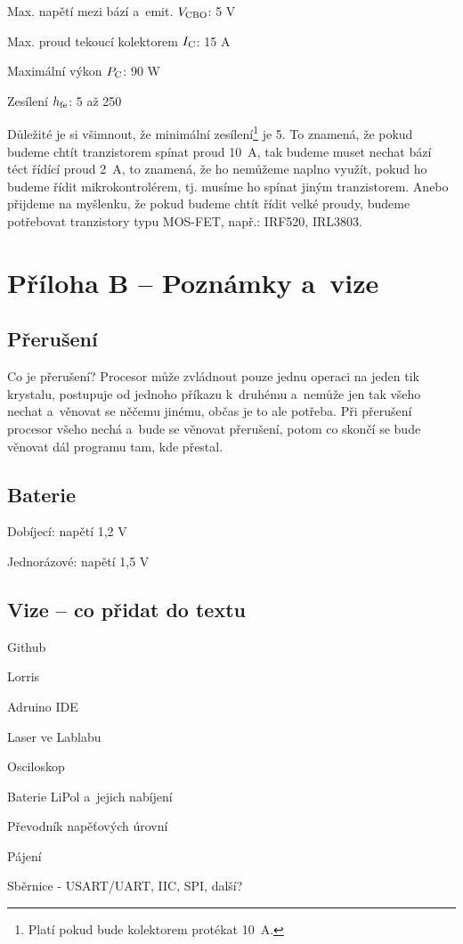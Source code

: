Max. napětí mezi bází a~emit. $V \rm _{CBO}$: 5 V

Max. proud tekoucí kolektorem $I \rm _C$: 15 A

Maximální výkon $P \rm _C$: 90 W

Zesílení $h \rm _{fe}$: 5 až 250

Důležité je si všimnout, že minimální zesílení\footnote{Platí pokud bude kolektorem protékat 10~A.}  je 5. 
To znamená, že pokud budeme chtít tranzistorem spínat proud 10~A, tak budeme muset nechat bází téct řídící proud 2~A,
 to znamená, že ho nemůžeme naplno využít, pokud ho budeme řídit mikrokontrolérem, tj. musíme ho spínat jiným tranzistorem. 
 Anebo přijdeme na myšlenku, že pokud budeme chtít řídit velké proudy, budeme potřebovat tranzistory typu MOS-FET, např.: IRF520, IRL3803.




\section{ Příloha B -- Poznámky a~vize}



\subsection{Přerušení}

Co je přerušení? Procesor může zvládnout pouze jednu operaci na jeden tik krystalu, 
postupuje od jednoho příkazu k~druhému a~nemůže jen tak všeho nechat a~věnovat se něčemu jinému, občas je to ale potřeba.
 Při přerušení procesor všeho nechá a~bude se věnovat přerušení, potom co skončí se bude věnovat dál programu tam, kde přestal. 

\subsection{Baterie}

Dobíjecí: napětí 1,2 V~

Jednorázové: napětí 1,5 V~
 
\subsection{Vize -- co přidat do textu}

Github

Lorris

Adruino IDE 

Laser ve Lablabu 

Osciloskop

Baterie LiPol a~jejich nabíjení 

Převodník napěťových úrovní 

Pájení 

Sběrnice - USART/UART, IIC, SPI, další?
